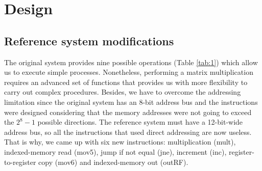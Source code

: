 \documentclass[]{article}
\begin{document}
\section{Design}

\subsection{Reference system modifications}
The original system provides nine possible operations (Table \ref{tab:1}) which allow us to execute simple processes. Nonetheless, performing a matrix multiplication requires an advanced set of functions that provides us with more flexibility to carry out complex procedures. Besides, we have to overcome the addressing limitation since the original system has an 8-bit address bus and the instructions were designed considering that the memory addresses were not going to exceed the $2^8-1$ possible directions. The reference system must have a 12-bit-wide address bus, so all the instructions that used direct addressing are now useless. That is why, we came up with six new instructions: multiplication (mult), indexed-memory read (mov5), jump if not equal (jne), increment (inc), register-to-register copy (mov6) and indexed-memory out (outRF).
\end{document}
